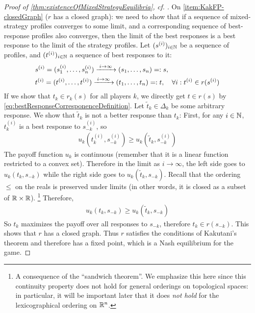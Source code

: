 \documentclass[a4paper]{scrreprt}
\begin{document}
\begin{proof}[Proof of \ref{thm:existenceOfMixedStrategyEquilibria}, cf. {\cite[p.29]{bib:fudenbergGameTheory}}]
        On \ref{item:KakFP-closedGraph} ($r$ has a closed graph): we need to show that if a sequence of mixed-strategy profiles converges to some limit, and a corresponding sequence of best-response profiles also converges, then the limit of the best responses is a best response to the limit of the strategy profiles. Let $(s^{(i)})_{i \in \mathbb{N}}$ be a sequence of profiles, and $(t^{(i)})_{i \in \mathbb{N}}$ a sequence of best responses to it:
        \begin{align*}
            &s^{(i)} = (s_1^{(i)}, \dots, s_n^{(i)}) \xrightarrow{\;i \to \infty\;} (s_1, \dots, s_n) =: s, \\
            &t^{(i)} = (t^{(i)}, \dots, t^{(i)}) \xrightarrow{\;i \to \infty\;} (t_1, \dots, t_n) =: t, \quad
            \forall i: t^{(i)} \in r(s^{(i)})
        \end{align*}
        If we show that $t_k \in r_k(s)$ for all players $k$, we directly get $t \in r(s)$ by \eqref{eq:bestResponseCorresponenceDefinition}.
        Let 
        $\tilde{t}_k \in \Delta_k$ be some arbitrary response. We show that $\tilde{t}_k$ is not a better response than $t_k$:
        First, for any $i \in \mathbb{N}$, $t^{(i)}_k$ is a best response to $s^{(i)}_{-k}$, so
        \begin{gather*}
            u_k(t^{(i)}_k, s^{(i)}_{-k}) \geq u_k(\tilde{t}_k, s^{(i)}_{-k})
        \end{gather*}
        The payoff function $u_k$ is continuous (remember that it is a linear function restricted to a convex set). Therefore in the limit as $i \to \infty$, the left side goes to $u_k(t_k, s_{-k})$ while the right side goes to $u_k(\tilde{t}_k, s_{-k})$.
        Recall that the ordering $\leq$ on the reals is preserved under limits (in other words, it is closed as a subset of $\mathbb{R} \times \mathbb{R}$).
        \footnote{A consequence of the “sandwich theorem”. We emphasize this here since this continuity property does not hold for general orderings on topological spaces:
        in particular, it will be important later that it does \emph{not hold} for the lexicographical ordering on $\mathbb{R}^n$.}
        Therefore,
        \begin{gather*}
            u_k(t_k, s_{-k}) \geq u_k(\tilde{t}_k, s_{-k})
        \end{gather*}
        So $t_k$ maximizes the payoff over all responses to $s_{-k}$, therefore $t_k \in r(s_{-k})$. This shows that $r$ has a closed graph.
        Thus $r$ satisfies the conditions of Kakutani's theorem and therefore has a fixed point, which is a Nash equilibrium for the game.
    \end{proof}
    
\end{document}
